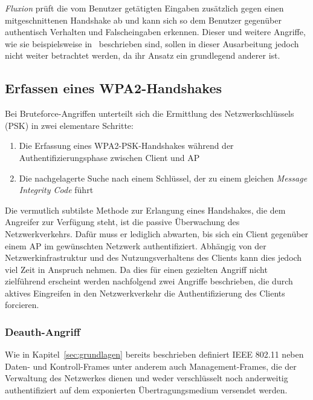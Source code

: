 \textit{Fluxion} prüft die vom Benutzer getätigten Eingaben zusätzlich gegen einen mitgeschnittenen Handshake ab und kann sich so dem Benutzer gegenüber authentisch Verhalten und Falscheingaben erkennen. 
Dieser und weitere Angriffe, wie sie beispielsweise in~\cite{caneill2010attacks} beschrieben sind, sollen in dieser Ausarbeitung jedoch nicht weiter betrachtet werden, da ihr Ansatz ein grundlegend anderer ist.\\

\subsection{Erfassen eines WPA2-Handshakes}
Bei Bruteforce-Angriffen unterteilt sich die Ermittlung des Netzwerkschlüssels (PSK) in zwei elementare Schritte: 
\begin{enumerate}
	\item Die Erfassung eines WPA2-PSK-Handshakes während der Authentifizierungsphase zwischen Client und AP
	\item Die nachgelagerte Suche nach einem Schlüssel, der zu einem gleichen \textit{Message Integrity Code} führt
\end{enumerate}
Die vermutlich subtilste Methode zur Erlangung eines Handshakes, die dem Angreifer zur Verfügung steht, ist die passive Überwachung des Netzwerkverkehrs.
Dafür muss er lediglich abwarten, bis sich ein Client gegenüber einem AP im gewünschten Netzwerk authentifiziert. 
Abhängig von der Netzwerkinfrastruktur und des Nutzungsverhaltens des Clients kann dies jedoch viel Zeit in Anspruch nehmen.
Da dies für einen gezielten Angriff nicht zielführend erscheint werden nachfolgend zwei Angriffe beschrieben, die durch aktives Eingreifen in den Netzwerkverkehr die Authentifizierung des Clients forcieren.

\subsubsection{Deauth-Angriff}\label{subs:deauthentication-attack}
Wie in Kapitel~\ref{sec:grundlagen} bereits beschrieben definiert IEEE 802.11 neben Daten- und Kontroll-Frames unter anderem auch Management-Frames, die der Verwaltung des Netzwerkes dienen und weder verschlüsselt noch anderweitig authentifiziert auf dem exponierten Übertragungsmedium versendet werden.

